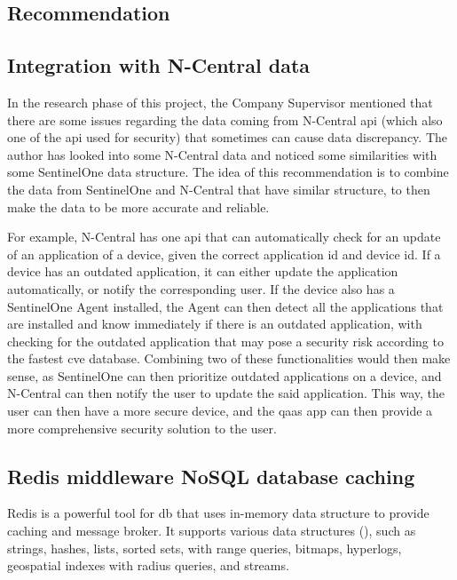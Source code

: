 \begin{multicols}{2}
  \section{Recommendation}

  \subsection{Integration with N-Central data}

  In the research phase of this project, the Company Supervisor mentioned that there are some issues regarding the data coming
  from N-Central \acrshort{api} (which also one of the \acrshort{api} used for security) that sometimes can cause data discrepancy. The author
  has looked into some N-Central data and noticed some similarities with some SentinelOne data structure. The idea of this recommendation
  is to combine the data from SentinelOne and N-Central that have similar structure, to then make the data to be more accurate and reliable.

  For example, N-Central has one \acrshort{api} that can automatically check for an update of an application
  of a device, given the correct application \acrshort{id} and device \acrshort{id}. If a device has an outdated application, it can either
  update the application automatically, or notify the corresponding user. If the device also has a SentinelOne Agent installed, the Agent
  can then detect all the applications that are installed and know immediately if there is an outdated application, with checking for the
  outdated application that may pose a security risk according to the fastest \acrshort{cve} database. Combining two of these functionalities
  would then make sense, as SentinelOne can then prioritize outdated applications on a device, and N-Central can then notify the user
  to update the said application. This way, the user can then have a more secure device, and the \acrshort{qaas} app can then provide a more
  comprehensive security solution to the user.

  \subsection{Redis middleware NoSQL database caching}

  Redis is a powerful tool for \acrshort{db} that uses in-memory data structure to provide caching and message broker. It supports
  various data structures (\textit{\cite{redisDataStructure}}), such as strings, hashes, lists, sorted sets, with range queries,
  bitmaps, hyperlogs, geospatial indexes with radius queries, and streams.


\end{multicols}
